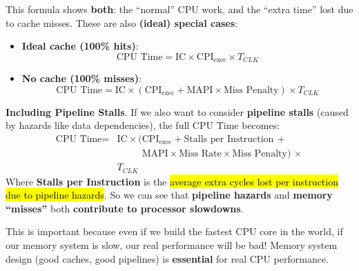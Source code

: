 \newpage
\noindent
This formula shows \textbf{both}: the ``normal'' CPU work, and the ``extra time'' lost due to cache misses. These are also \textbf{(ideal) special cases}:
\begin{itemize}
    \item[\textcolor{Green3}{\faIcon{check}}] \textcolor{Green3}{\textbf{Ideal cache (100\% hits)}}:
    \begin{equation*}
        \text{CPU Time} = \text{IC} \times \text{CPI}_{\text{exec}} \times T_{CLK}
    \end{equation*}
    \item[\textcolor{Red2}{\faIcon{times}}] \textcolor{Red2}{\textbf{No cache (100\% misses)}}:
    \begin{equation*}
        \text{CPU Time} = \text{IC} \times (\text{CPI}_{\text{exec}} + \text{MAPI} \times \text{Miss Penalty}) \times T_{CLK}
    \end{equation*}
\end{itemize}
\textcolor{Red2}{ \textbf{Including Pipeline Stalls}}. If we also want to consider \textbf{pipeline stalls} (caused by hazards like data dependencies), the full CPU Time becomes:
\begin{equation}
    \begin{array}{rl}
        \text{CPU Time} =& \text{IC} \times (\text{CPI}_{\text{exec}} + \text{Stalls per Instruction}\, + \\ [.5em]
                         & \phantom{\text{IC} \times (} \text{MAPI} \times \text{Miss Rate} \times \text{Miss Penalty})\, \times \\ [.5em]
                         & T_{CLK}
    \end{array}
\end{equation}
Where \textbf{Stalls per Instruction} is the \hl{average extra cycles lost per instruction due to pipeline hazards}. So we can see that \textbf{pipeline hazards} and \textbf{memory ``misses''} both \textbf{contribute to processor slowdowns}.

\highspace
This is important because even if we build the fastest CPU core in the world, if our memory system is slow, our real performance will be bad! Memory system design (good caches, good pipelines) is \textbf{essential} for real CPU performance.

\newpage

